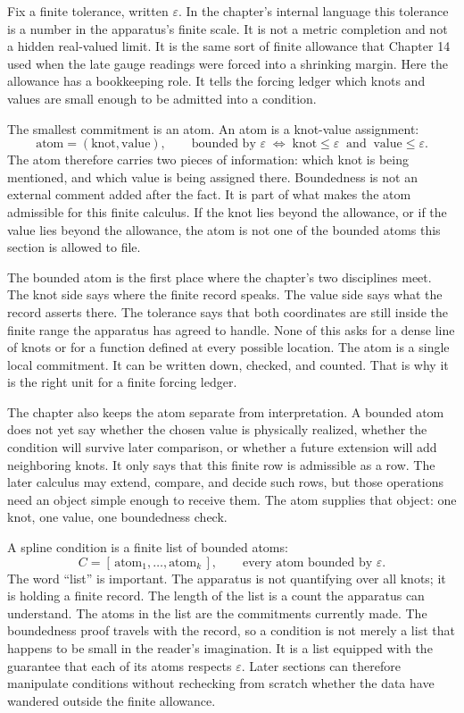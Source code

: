 Fix a finite tolerance, written \(\varepsilon\). In the chapter's internal
language this tolerance is a number in the apparatus's finite scale. It is not a
metric completion and not a hidden real-valued limit. It is the same sort of
finite allowance that Chapter 14 used when the late gauge readings were forced
into a shrinking margin. Here the allowance has a bookkeeping role. It tells the
forcing ledger which knots and values are small enough to be admitted into a
condition.

The smallest commitment is an atom. An atom is a knot-value assignment:
\[
  \text{atom} = (\mathrm{knot}, \mathrm{value}),
  \qquad
  \text{bounded by } \varepsilon
  \;\Longleftrightarrow\;
  \mathrm{knot} \le \varepsilon \ \text{ and }\ \mathrm{value} \le \varepsilon.
\]
The atom therefore carries two pieces of information: which knot is being
mentioned, and which value is being assigned there. Boundedness is not an
external comment added after the fact. It is part of what makes the atom
admissible for this finite calculus. If the knot lies beyond the allowance, or
if the value lies beyond the allowance, the atom is not one of the bounded atoms
this section is allowed to file.

The bounded atom is the first place where the chapter's two disciplines meet.
The knot side says where the finite record speaks. The value side says what the
record asserts there. The tolerance says that both coordinates are still inside
the finite range the apparatus has agreed to handle. None of this asks for a
dense line of knots or for a function defined at every possible location. The
atom is a single local commitment. It can be written down, checked, and counted.
That is why it is the right unit for a finite forcing ledger.

The chapter also keeps the atom separate from interpretation. A bounded atom
does not yet say whether the chosen value is physically realized, whether the
condition will survive later comparison, or whether a future extension will add
neighboring knots. It only says that this finite row is admissible as a row. The
later calculus may extend, compare, and decide such rows, but those operations
need an object simple enough to receive them. The atom supplies that object: one
knot, one value, one boundedness check.

A spline condition is a finite list of bounded atoms:
\[
  C = [\,\text{atom}_1, \ldots, \text{atom}_k\,],
  \qquad
  \text{every atom bounded by } \varepsilon.
\]
The word ``list'' is important. The apparatus is not quantifying over all
knots; it is holding a finite record. The length of the list is a count the
apparatus can understand. The atoms in the list are the commitments currently
made. The boundedness proof travels with the record, so a condition is not
merely a list that happens to be small in the reader's imagination. It is a list
equipped with the guarantee that each of its atoms respects \(\varepsilon\).
Later sections can therefore manipulate conditions without rechecking from
scratch whether the data have wandered outside the finite allowance.

